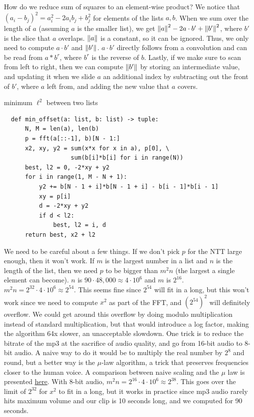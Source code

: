 \documentclass[11pt, oneside]{article}
\theoremstyle{plain}
\theoremstyle{definition}
\begin{document}
How do we reduce sum of squares to an element-wise product? We notice that
\( (a_i - b_j)^2 = a_i^2 - 2a_i b_j + b_j^2 \) for elements of the lists
\( a, b \). When we sum over the length of \( a \) (assuming \( a \) is the 
smaller list), we get \( \norm{a}^2 - 2 a \cdot b' + \norm{b'}^2 \),
where \( b' \) is the slice that \( a \) overlaps. \( \norm{a} \) is a constant,
so it can be ignored. Thus, we only need to compute \( a \cdot b' \) and
\( \norm{b'} \). \( a \cdot b' \) directly follows from a convolution and
can be read from \( a * b^r \), where \( b^r \) is the reverse of \( b \).
Lastly, if we make sure to scan from left to right, then we can compute
\( \norm{b'} \) by storing an intermediate value, and updating it when we slide 
\( a \) an additional index by subtracting out the front of \( b' \), where
\( a \) left from, and adding the new value that \( a \) covers.

\begin{algorithm}
  \caption{minimum \( \ell^2 \) between two lists}
  \begin{verbatim}
  def min_offset(a: list, b: list) -> tuple:
      N, M = len(a), len(b)
      p = fft(a[::-1], b)[N - 1:]
      x2, xy, y2 = sum(x*x for x in a), p[0], \
                   sum(b[i]*b[i] for i in range(N))
      best, l2 = 0, -2*xy + y2
      for i in range(1, M - N + 1):
          y2 += b[N - 1 + i]*b[N - 1 + i] - b[i - 1]*b[i - 1]
          xy = p[i]
          d = -2*xy + y2
          if d < l2:
              best, l2 = i, d
      return best, x2 + l2
  \end{verbatim}
\end{algorithm}

We need to be careful about a few things. If we don't pick \( p \) for the NTT
large enough, then it won't work. If \( m \) is the largest number in a list
and \( n \) is the length of the list, then we need \( p \) to be bigger than
\( m^2 n \) (the largest a single element can become).
\( n \) is \( 90 \cdot 48,000 \approx 4 \cdot 10^6 \) and \( m \) is
\( 2^{16} \). \( m^2 n = 2^{32} \cdot 4 \cdot 10^6 \approx 2^{54} \).
This seems fine since \( 2^{54} \) will fit in a long, but this won't work
since we need to compute \( x^2 \) as part of the FFT, and \( (2^{54})^2 \)
will definitely overflow. We could get around this overflow by doing modulo
multiplication instead of standard multiplication, but that would introduce
a log factor, making the algorithm 64x slower, an unacceptable slowdown.
One trick is to reduce the bitrate of the mp3
at the sacrifice of audio quality, and go from 16-bit audio to 8-bit audio.
A naive way to do it would be to multiply the real number by \( 2^8 \) and
round, but a better way is the \( \mu \)-law algorithm, a trick that preserves
frequencies closer to the human voice. A comparison between naive scaling
and the \( \mu \) law is presented
\href{https://www.youtube.com/watch?v=PqkE_t5cCoA}{here}.
With 8-bit audio, \( m^2 n = 2^{16} \cdot 4 \cdot 10^6 \approx 2^{38} \).
This goes over the limit of \( 2^{32} \) for \( x^2 \) to fit in a long,
but it works in practice since mp3 audio rarely hits maximum volume and
our clip is 10 seconds long, and we computed for 90 seconds.
\end{document}
